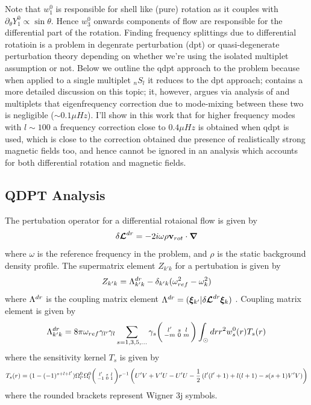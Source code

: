Note that $w_1^0$ is responsible for shell like (pure) rotation as it couples with $\partial_{\theta} Y_1^0 \propto \sin\theta$. Hence $w_3^0$ onwards components of flow are responsible for the differential part of the rotation. Finding frequency splittings due to differential rotatioin is a problem in degenrate perturbation (dpt) or quasi-degenerate perturbation theory depending on whether we're using the isolated multiplet assumption or not. Below we outline the qdpt approach to the problem because when applied to a single multiplet $_n S_l$ it reduces to the dpt approach; \cite{lavely92} contains a more detailed discussion on this topic; it, however, argues via analysis of  and  multiplets that eigenfrequency correction due to mode-mixing between these two is negligible ($\sim 0.1 \mu Hz$). I'll show in this work that for higher frequency modes with $l\sim 100$ a frequency correction close to $0.4 \mu Hz$ is obtained when qdpt is used, which is close to the correction obtained due presence of realistically strong magnetic fields too, and hence cannot be ignored in an analysis which accounts for both differential rotation and magnetic fields.

\subsection{QDPT Analysis}
The pertubation operator \dLd for a differential rotaional flow is given by 
\begin{equation}
\delta \bm{\mathcal{L}}^{dr} = -2i \omega \rho \mathbf{v}_{rot} \cdot \bm{\nabla}
\end{equation}
where $\omega$ is the reference frequency in the problem, and $\rho$ is the static background density profile.
The supermatrix element $Z_{k' k}$ for a pertubation \dLd is given by
\begin{equation}
Z_{k' k} = \Lambda^{dr}_{k'k} - \delta_{k'k} (\omega_{ref}^2 - \omega_k^2)
\end{equation}
where $\Lambda^{dr}$ is the coupling matrix element $\Lambda^{dr} = (\bm{\xi}_{k'}|\delta \bm{\mathcal{L}}^{dr} \bm{\xi}_{k})$ .
Coupling matrix element is given by
\begin{equation}
\Lambda^{dr}_{k'k} = 8 \pi \omega_{ref} \gamma_{l'}\gamma_{l} \sum_{s=1,3,5,...} \gamma_{s} \bigg(\begin{smallmatrix} l' & s & l \\ -m & 0 & m \end{smallmatrix}\bigg) \int_{\odot} dr 
r^2 w_s^0(r) T_s(r)
\end{equation}
where the sensitivity kernel $T_s$ is given by
\begin{dmath}
T_s(r) = (1-(-1)^{s+l+l'}) \om{l'}{0} \om{l}{0} \wigred{-1}{0}{1} r^{-1}
 \enc{U'V+V'U-U'U-\frac{1}{2}\enc{l'(l'+1) + l(l+1) - s(s+1) V'V}}
\end{dmath}
where the rounded brackets represent Wigner 3j symbols. 
